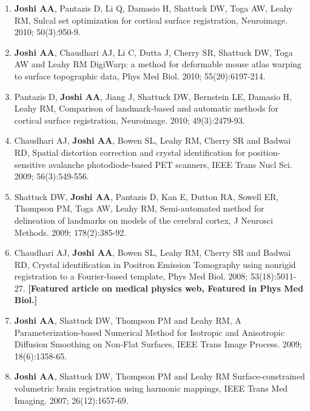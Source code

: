 \documentclass[overlapped,line,letterpaper]{res}
\begin{document}
\begin{resume}
\begin{enumerate}
    \item \textbf{Joshi AA}, Pantazis D, Li Q, Damasio H, Shattuck DW, Toga AW, Leahy RM, {Sulcal set optimization for cortical surface registration}, Neuroimage. 2010; 50(3):950-9.

    \item \textbf{Joshi AA}, Chaudhari AJ,  Li C, Dutta J, Cherry SR, Shattuck DW, Toga AW and Leahy RM {DigiWarp: a method for deformable mouse atlas warping to surface topographic data}, Phys Med Biol. 2010; 55(20):6197-214.

    \item Pantazis D, \textbf{Joshi AA}, Jiang J, Shattuck DW, Bernstein LE, Damasio H, Leahy RM, {Comparison of landmark-based and automatic methods for cortical surface registration}, Neuroimage. 2010; 49(3):2479-93.

    \item Chaudhari AJ, \textbf{Joshi AA}, Bowen SL, Leahy RM, Cherry SR and Badwai RD, {Spatial distortion correction and crystal identification for position-sensitive avalanche photodiode-based PET scanners}, IEEE Trans Nucl Sci. 2009; 56(3):549-556.

    \item Shattuck DW, \textbf{Joshi AA}, Pantazis D, Kan E, Dutton RA, Sowell ER, Thompson PM, Toga AW, Leahy RM, {Semi-automated method for delineation of landmarks on models of the cerebral cortex}, J Neurosci Methods. 2009; 178(2):385-92.

    \item Chaudhari AJ, \textbf{Joshi AA}, Bowen SL, Leahy RM, Cherry SR and Badwai RD, {Crystal identification in Positron Emission Tomography using nonrigid registration to a Fourier-based template}, Phys Med Biol. 2008; 53(18):5011-27. \textbf{[Featured article on medical physics web, Featured in Phys Med Biol.]}

    \item \textbf{Joshi AA}, Shattuck DW, Thompson PM and Leahy RM, {A Parameterization-based Numerical Method for Isotropic and Anisotropic Diffusion Smoothing on Non-Flat Surfaces}, IEEE Trans Image Process. 2009; 18(6):1358-65.

    \item \textbf{Joshi AA}, Shattuck DW, Thompson PM and Leahy RM {Surface-constrained volumetric brain registration using harmonic mappings}, IEEE Trans Med Imaging. 2007; 26(12):1657-69.
\end{enumerate}



\end{resume}
\end{document}
